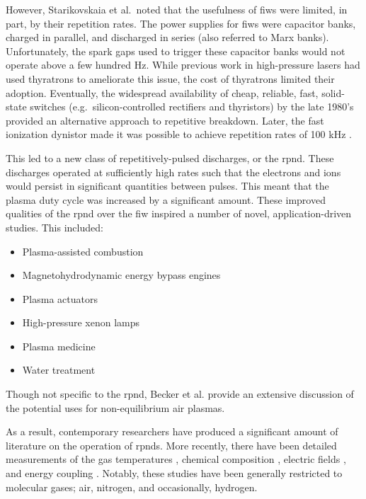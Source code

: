 However, Starikovskaia et al.\ noted that the usefulness of \acs{fiw}s were
limited, in part, by their repetition rates. The power supplies for \acs{fiw}s
were capacitor banks, charged in parallel, and discharged in series (also
referred to Marx banks). Unfortunately, the spark gaps used to trigger these
capacitor banks would not operate above a few hundred Hz. While previous work in
high-pressure lasers had used thyratrons to ameliorate this issue, the cost of
thyratrons limited their adoption. Eventually, the widespread availability of
cheap, reliable, fast, solid-state switches (e.g.\ silicon-controlled rectifiers
and thyristors) by the late 1980's provided an alternative approach to
repetitive breakdown. Later, the fast ionization dynistor made it was possible
to achieve repetition rates of 100 kHz \cite{Efanov1997}.

This led to a new class of repetitively-pulsed discharges, or the \acs{rpnd}.
These discharges operated at sufficiently high rates such that the electrons and
ions would persist in significant quantities between pulses. This meant that the
plasma duty cycle was increased by a significant amount. These improved
qualities of the \acs{rpnd} over the \acs{fiw} inspired a number of novel,
application-driven studies. This included:
\begin{itemize}
  \item Plasma-assisted combustion \cite{Pancheshnyi2006, Starikovskaia2006, 
        Adamovich2008}
  \item Magnetohydrodynamic energy bypass engines \cite{Macheret2002,
        Adamovich2008, Schneider2009a}
  \item Plasma actuators \cite{Starikovskii2009, Adamovich2009}
  \item High-pressure xenon lamps \cite{Nikandrov2008}
  \item Plasma medicine \cite{Ayan2009, Zimmermann2012}
  \item Water treatment \cite{Foster2013}
\end{itemize}
Though not specific to the \acs{rpnd}, Becker et al. \cite{Becker2005} provide
an extensive discussion of the potential uses for non-equilibrium air plasmas.

As a result, contemporary researchers have produced a significant amount of
literature on the operation of \acs{rpnd}s. More recently, there have been
detailed measurements of the gas temperatures \cite{Pilla2006, Pancheshnyi2006,
Nishihara2006, Bao2007, Lou2007, Pai2009, Zuzeek2010, Nishihara2011}, chemical
composition \cite{Bao2007, Lou2007, Pai2009}, electric fields \cite{Ito2009,
Ito2010, Muller2011a}, and energy coupling \cite{Macheret2006, Pancheshnyi2006}.
Notably, these studies have been generally restricted to molecular gases; air,
nitrogen, and occasionally, hydrogen.


